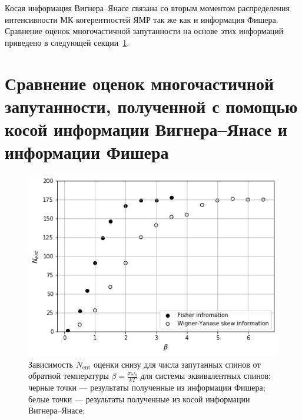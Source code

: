 \documentclass[preprint,12pt]{elsarticle}
\begin{document}
Косая информация Вигнера--Янасе связана со вторым моментом распределения интенсивности МК когерентностей ЯМР так же как и информация Фишера.
Сравнение оценок многочастичной запутанности на основе этих информаций приведено в следующей секции~\ref{sec:4}. 



\section{Сравнение оценок многочастичной запутанности, полученной с помощью косой информации Вигнера--Янасе и информации Фишера}
\label{sec:4}

\begin{figure}
	\includegraphics[width=0.95\linewidth]{nanopora_entangled_spins_by_temp}
	\caption{
	    Зависимость $N_\mathrm{ent}$ оценки снизу для числа запутанных спинов от обратной температуры $\beta = \frac{\pi \omega_0}{kT}$ для системы эквивалентных спинов;
	    черные точки --- результаты полученные из информации Фишера;
	    белые точки --- результаты полученные из косой информации Вигнера--Янасе;
	}
	\label{fig:2}
\end{figure}
\end{document}
